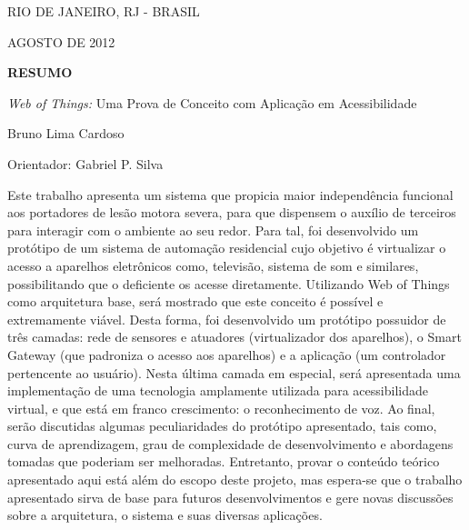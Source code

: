\begin{titlepage}
\begin{center}

RIO DE JANEIRO, RJ - BRASIL

AGOSTO DE 2012

\end{center}

\bigskip

\clearpage
\bigskip

\begin{center}
\centerline{\textbf{\large RESUMO}}


\bigskip

\emph{Web of Things:} Uma Prova de Conceito com Aplicação em Acessibilidade


\bigskip

Bruno Lima Cardoso


\end{center}
\bigskip


\bigskip


Orientador: Gabriel P. Silva 


\bigskip


\bigskip

Este trabalho apresenta um sistema que propicia maior independência funcional aos portadores de lesão motora severa, para que dispensem o auxílio de terceiros para interagir com o ambiente ao seu redor. Para tal, foi desenvolvido um protótipo de um sistema de automação residencial cujo objetivo é virtualizar o acesso a aparelhos eletrônicos como, televisão, sistema de som e similares,  possibilitando que o deficiente os acesse diretamente. Utilizando Web of Things como arquitetura base, será mostrado que este conceito é possível e extremamente viável. Desta forma, foi desenvolvido um protótipo possuidor de três camadas: rede de sensores e atuadores (virtualizador dos aparelhos), o Smart Gateway (que padroniza o acesso aos aparelhos) e a aplicação (um controlador pertencente ao usuário). Nesta última camada em especial, será apresentada uma implementação de uma tecnologia amplamente utilizada para acessibilidade virtual, e que está em franco crescimento: o reconhecimento de voz. Ao final, serão discutidas algumas peculiaridades do protótipo apresentado, tais como, curva de aprendizagem, grau de complexidade de desenvolvimento e abordagens tomadas que poderiam ser melhoradas. Entretanto, provar o conteúdo teórico apresentado aqui está além do escopo deste projeto, mas espera-se que o trabalho apresentado sirva de base para futuros desenvolvimentos e gere novas discussões sobre a arquitetura, o sistema e suas diversas aplicações.


\end{titlepage}
